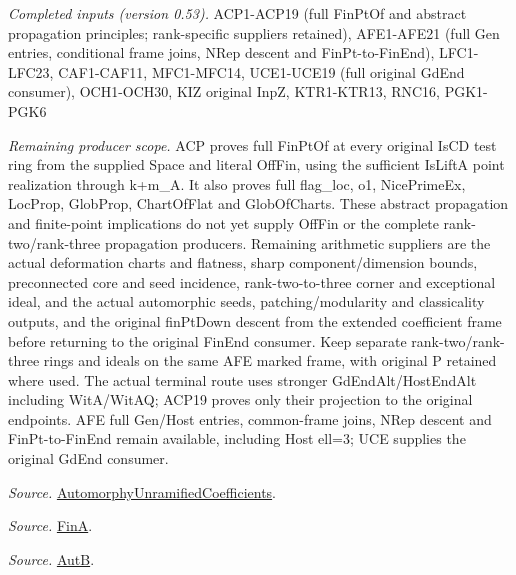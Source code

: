 \documentclass[11pt,a4paper]{article}
\numberwithin{equation}{section}
\theoremstyle{remark}\newtheorem{remark}[theorem]{Remark}
\begin{document}
\emph{Completed inputs (version 0.53).} ACP1-ACP19 (full FinPtOf and abstract propagation principles; rank-specific suppliers retained), AFE1-AFE21 (full Gen entries, conditional frame joins, NRep descent and FinPt-to-FinEnd), LFC1-LFC23, CAF1-CAF11, MFC1-MFC14, UCE1-UCE19 (full original GdEnd consumer), OCH1-OCH30, KIZ original InpZ, KTR1-KTR13, RNC16, PGK1-PGK6

\emph{Remaining producer scope.} ACP proves full FinPtOf at every original IsCD test ring from the supplied Space and literal OffFin, using the sufficient IsLiftA point realization through k+m\_\allowbreak A. It also proves full flag\_\allowbreak loc, o1, NicePrimeEx, LocProp, GlobProp, ChartOfFlat and GlobOfCharts. These abstract propagation and finite-point implications do not yet supply OffFin or the complete rank-two/rank-three propagation producers. Remaining arithmetic suppliers are the actual deformation charts and flatness, sharp component/dimension bounds, preconnected core and seed incidence, rank-two-to-three corner and exceptional ideal, and the actual automorphic seeds, patching/modularity and classicality outputs, and the original finPtDown descent from the extended coefficient frame before returning to the original FinEnd consumer. Keep separate rank-two/rank-three rings and ideals on the same AFE marked frame, with original P retained where used. The actual terminal route uses stronger GdEndAlt/HostEndAlt including WitA/WitAQ; ACP19 proves only their projection to the original endpoints. AFE full Gen/Host entries, common-frame joins, NRep descent and FinPt-to-FinEnd remain available, including Host ell=3; UCE supplies the original GdEnd consumer.

\emph{Source.} \href{https://github.com/CocoSgt/riemann-hypothesis-lean/blob/7cbf7a0c32fca1badf05931879a37c3f8a2b03b4/src/Development/AutomorphicArithmetic/AutomorphicVarieties/AutomorphicCases/AutomorphyUnramifiedCoefficients.lean#L24-L27}{AutomorphyUnramifiedCoefficients}.

\emph{Source.} \href{https://github.com/CocoSgt/riemann-hypothesis-lean/blob/7cbf7a0c32fca1badf05931879a37c3f8a2b03b4/src/Development/AutomorphicArithmetic/AutomorphicVarieties/AutomorphicCases/AutomorphyUnramifiedCoefficients.lean#L12-L13}{FinA}.

\emph{Source.} \href{https://github.com/CocoSgt/riemann-hypothesis-lean/blob/7cbf7a0c32fca1badf05931879a37c3f8a2b03b4/src/Development/AutomorphicArithmetic/AutomorphicVarieties/AutomorphicCases/AutomorphyUnramifiedCoefficients.lean#L15-L17}{AutB}.
\end{document}
